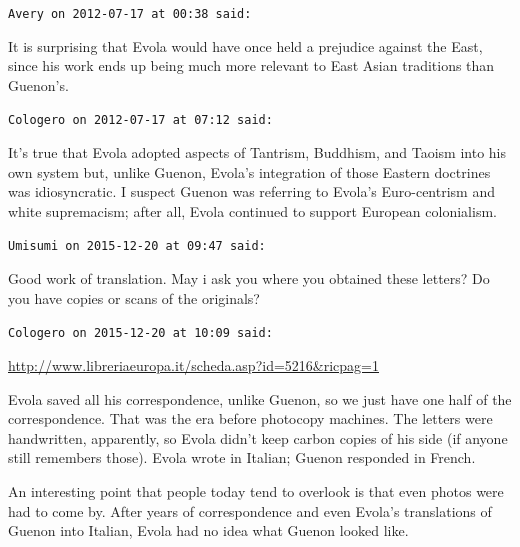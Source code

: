 \begin{footnotesize}\begin{sffamily}



\texttt{Avery on 2012-07-17 at 00:38 said: }

It is surprising that Evola would have once held a prejudice against the East, since his work ends up being much more relevant to East Asian traditions than Guenon's.


\hfill

\texttt{Cologero on 2012-07-17 at 07:12 said: }

It's true that Evola adopted aspects of Tantrism, Buddhism, and Taoism into his own system but, unlike Guenon, Evola's integration of those Eastern doctrines was idiosyncratic. I suspect Guenon was referring to Evola's Euro-centrism and white supremacism; after all, Evola continued to support European colonialism.


\hfill

\texttt{Umisumi on 2015-12-20 at 09:47 said: }

Good work of translation. May i ask you where you obtained these letters? Do you have copies or scans of the originals?


\hfill

\texttt{Cologero on 2015-12-20 at 10:09 said: }

\url{http://www.libreriaeuropa.it/scheda.asp?id=5216\&ricpag=1}

Evola saved all his correspondence, unlike Guenon, so we just have one half of the correspondence. That was the era before photocopy machines. The letters were handwritten, apparently, so Evola didn't keep carbon copies of his side (if anyone still remembers those). Evola wrote in Italian; Guenon responded in French.

An interesting point that people today tend to overlook is that even photos were had to come by. After years of correspondence and even Evola's translations of Guenon into Italian, Evola had no idea what Guenon looked like.


\end{sffamily}\end{footnotesize}
